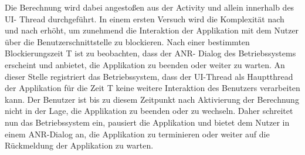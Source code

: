\documentclass[12pt,oneside,a4paper,bibtotoc,liststotoc]{scrreprt}
\begin{document}
Die Berechnung wird dabei angestoßen aus der Activity und allein innerhalb des UI- Thread durchgeführt. In einem ersten Versuch wird die Komplexität nach und nach erhöht, um zunehmend die Interaktion der Applikation mit dem Nutzer über die Benutzerschnittstelle zu blockieren. Nach einer bestimmten Blockierungszeit T ist zu beobachten, dass der ANR- Dialog des Betriebssystems erscheint und anbietet, die Applikation zu beenden oder weiter zu warten. An dieser Stelle registriert das Betriebssystem, dass der UI-Thread als Hauptthread der Applikation für die Zeit T keine weitere Interaktion des Benutzers verarbeiten kann. Der Benutzer ist bis zu diesem Zeitpunkt nach Aktivierung der Berechnung nicht in der Lage, die Applikation zu beenden oder zu wechseln. Daher schreitet nun das Betriebssystem ein, pausiert die Applikation und bietet dem Nutzer in einem ANR-Dialog an, die Applikation zu terminieren oder weiter auf die Rückmeldung der Applikation zu warten.
\end{document}
